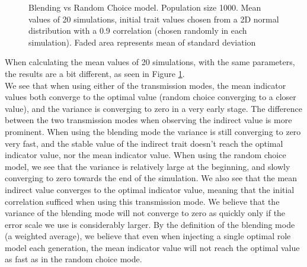 \documentclass[11pt]{article}
\begin{document}
\begin{figure}
\begin{subfigure}[b]{\linewidth}
  \end{subfigure}
  \caption{Blending vs Random Choice model. Population size 1000. Mean values of 20 simulations, initial trait values chosen from a 2D normal distribution with a 0.9 correlation (chosen randomly in each simulation). Faded area represents mean of standard deviation}
  \label{randomVSblendingFigMultiple}
\end{figure}

When calculating the mean values of 20 simulations, with the same parameters, the results are a bit different, as seen in Figure \ref{randomVSblendingFigMultiple}.\\
We see that when using either of the transmission modes, the mean indicator values both converge to the optimal value (random choice converging to a closer value), and the variance is converging to zero in a very early stage. %
The difference between the two transmission modes when observing the indirect value is more prominent. %
When using the blending mode the variance is still converging to zero very fast, and the stable value of the indirect trait doesn't reach the optimal indicator value, nor the mean indicator value. %
When using the random choice model, we see that the variance is relatively large at the beginning, and slowly converging to zero towards the end of the simulation. %
We also see that the mean indirect value converges to the optimal indicator value, meaning that the initial correlation sufficed when using this transmission mode.
We believe that the variance of the blending mode will not converge to zero as quickly only if the error scale we use is considerably larger.
By the definition of the blending mode (a weighted average), we believe that even when injecting a single optimal role model each generation, the mean indicator value will not reach the optimal value as fast as in the random choice mode. \\ %
   
\end{document}
